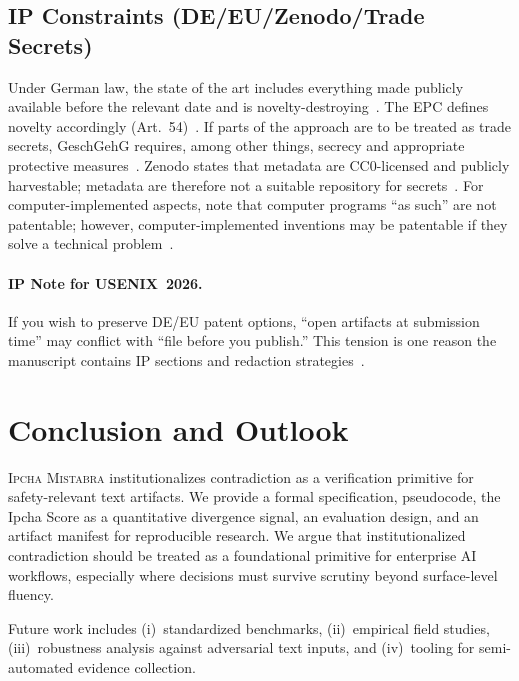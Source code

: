 \documentclass[11pt,a4paper]{article}
\newcommand{\methodname}{\textsc{Ipcha Mistabra}}
\begin{document}
\subsection{IP Constraints (DE/EU/Zenodo/Trade Secrets)}
Under German law, the state of the art includes everything made publicly available before the relevant date and is novelty-destroying~\cite{patg_par3}.
The EPC defines novelty accordingly (Art.~54)~\cite{epue_art54}.
If parts of the approach are to be treated as trade secrets, GeschGehG requires, among other things, secrecy and appropriate protective measures~\cite{geschgehg_par2}.
Zenodo states that metadata are CC0-licensed and publicly harvestable; metadata are therefore not a suitable repository for secrets~\cite{zenodo_policies}.
For computer-implemented aspects, note that computer programs ``as such'' are not patentable; however, computer-implemented inventions may be patentable if they solve a technical problem~\cite{dpma_cie}.

\paragraph{IP Note for USENIX~2026.}
If you wish to preserve DE/EU patent options, ``open artifacts at submission time'' may conflict with ``file before you publish.''
This tension is one reason the manuscript contains IP sections and redaction strategies~\cite{usenix_sec26_artifacts,patg_par3,epue_art54}.

\section{Conclusion and Outlook}
\methodname{} institutionalizes contradiction as a verification primitive for safety-relevant text artifacts.
We provide a formal specification, pseudocode, the Ipcha Score as a quantitative divergence signal, an evaluation design, and an artifact manifest for reproducible research.
We argue that institutionalized contradiction should be treated as a foundational primitive for enterprise AI workflows, especially where decisions must survive scrutiny beyond surface-level fluency.

Future work includes
(i)~standardized benchmarks,
(ii)~empirical field studies,
(iii)~robustness analysis against adversarial text inputs, and
(iv)~tooling for semi-automated evidence collection.
\end{document}
